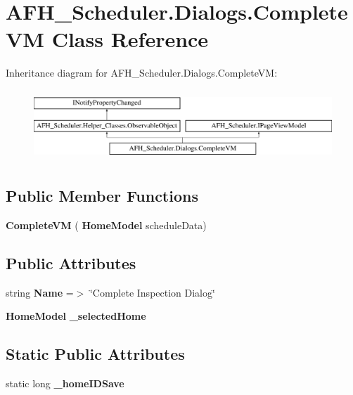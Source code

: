 \section{A\+F\+H\+\_\+\+Scheduler.\+Dialogs.\+Complete\+VM Class Reference}
\label{class_a_f_h___scheduler_1_1_dialogs_1_1_complete_v_m}
Inheritance diagram for A\+F\+H\+\_\+\+Scheduler.\+Dialogs.\+Complete\+VM\+:\begin{figure}[H]
\begin{center}
\leavevmode
\includegraphics[height=2.700965cm]{class_a_f_h___scheduler_1_1_dialogs_1_1_complete_v_m}
\end{center}
\end{figure}
\subsection*{Public Member Functions}
\begin{DoxyCompactItemize}
\item 
\mbox{\label{class_a_f_h___scheduler_1_1_dialogs_1_1_complete_v_m_a1fa471acc4651c9673c3ab8ded4f0b11}} 
{\bfseries Complete\+VM} (\textbf{ Home\+Model} schedule\+Data)
\end{DoxyCompactItemize}
\subsection*{Public Attributes}
\begin{DoxyCompactItemize}
\item 
\mbox{\label{class_a_f_h___scheduler_1_1_dialogs_1_1_complete_v_m_ab7e4e7471d755535228dfb89ac78378b}} 
string {\bfseries Name} =$>$ \char`\"{}Complete Inspection Dialog\char`\"{}
\item 
\mbox{\label{class_a_f_h___scheduler_1_1_dialogs_1_1_complete_v_m_a33bca1904ab53988458a6b3493f01fec}} 
\textbf{ Home\+Model} {\bfseries \+\_\+selected\+Home}
\end{DoxyCompactItemize}
\subsection*{Static Public Attributes}
\begin{DoxyCompactItemize}
\item 
\mbox{\label{class_a_f_h___scheduler_1_1_dialogs_1_1_complete_v_m_a4390eac978e150b9c74d23d3c5512efd}} 
static long {\bfseries \+\_\+home\+I\+D\+Save}
\end{DoxyCompactItemize}
